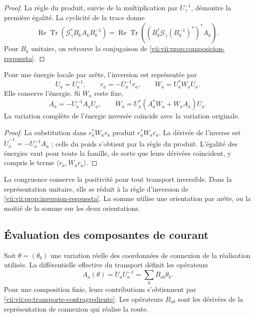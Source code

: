 \begin{proof}
La règle du produit, suivie de la multiplication par
\(U_\gamma^{-1}\), démontre la première égalité. La cyclicité
de la trace donne
\[
 \operatorname{Re}\operatorname{Tr}
  (\mathcal G_\gamma^*B_kA_kB_k^{-1})
 =\operatorname{Re}\operatorname{Tr}
  ((B_k^*\mathcal G_\gamma(B_k^{-1})^*)^*A_k).
\]
Pour \(B_k\) unitaire, on retrouve la conjugaison de
\ref{vii:vii:prop:composicion-respuesta}.
\end{proof}

\begin{proposition}
\label{vii:vii:prop:inversion-congruencia}
Pour une énergie locale par arête, l'inversion est représentée par
\begin{equation}
 U_{\bar a}=U_a^{-1},\qquad
 r_{\bar a}=-U_a^{-1}r_a,\qquad
 W_{\bar a}=U_a^*W_aU_a.
 \label{vii:vii:eq:inversion-peso-general}
\end{equation}
Elle conserve l'énergie. Si \(W_a\) reste fixe,
\[
 A_{\bar a}=-U_a^{-1}A_aU_a,\qquad
 \dot W_{\bar a}=U_a^*(A_a^*W_a+W_aA_a)U_a.
\]
La variation complète de l'énergie inversée coïncide avec la variation originale.
\end{proposition}

\begin{proof}
La substitution dans \(r_{\bar a}^*W_{\bar a}r_{\bar a}\) produit \(r_a^*W_ar_a\). La dérivée de l'inverse est \(\dot U_a^{-1}=-U_a^{-1}A_a\) ; celle du poids s'obtient par la règle du produit. L'égalité des énergies vaut pour toute la famille, de sorte que leurs dérivées coïncident, y compris le terme \(\langle r_{\bar a},\dot W_{\bar a}r_{\bar a}\rangle\).
\end{proof}

La congruence conserve la positivité pour tout transport inversible.
Dans la représentation unitaire, elle se réduit à la règle d'inversion de
\ref{vii:vii:prop:inversion-respuesta}. La somme utilise une orientation
par arête, ou la moitié de la somme sur les deux orientations.

\subsection{Évaluation des composantes de courant}

Soit \(\theta=(\theta_b)\) une variation réelle des coordonnées
de connexion de la réalisation utilisée. La différentielle effective du
transport définit les opérateurs
\begin{equation}
 A_a(\theta)=\dot U_aU_a^{-1}
     =\sum_bB_{ab}\theta_b.
 \label{vii:vii:eq:diferencial-conexion-transporte}
\end{equation}
Pour une composition finie, leurs contributions s'obtiennent par
\eqref{vii:vii:eq:transporte-contragrediente}. Les opérateurs
\(B_{ab}\) sont les dérivées de la représentation de connexion qui
réalise la route.

